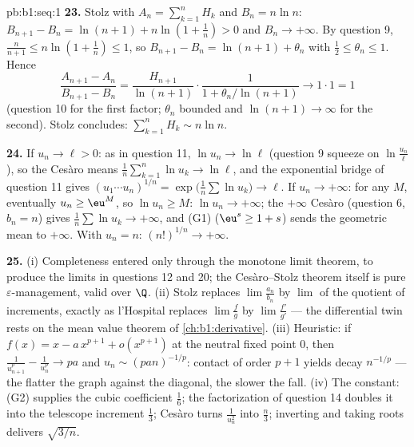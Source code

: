 \begin{solution}{pb:b1:seq:1}
\textbf{23.} Stolz with $A_n = \sum_{k=1}^n H_k$ and $B_n = n\ln
n$: $B_{n+1} - B_n = \ln(n+1) + n\ln(1 + \frac1n) > 0$ and $B_n
\to +\infty$. By question 9, $\frac{n}{n+1} \leq n\ln(1 +
\frac1n) \leq 1$, so $B_{n+1} - B_n = \ln(n+1) + \theta_n$ with
$\frac12 \leq \theta_n \leq 1$. Hence
\[
\frac{A_{n+1} - A_n}{B_{n+1} - B_n}
= \frac{H_{n+1}}{\ln(n+1)}\cdot
\frac{1}{1 + \theta_n/\ln(n+1)} \longrightarrow 1 \cdot 1 = 1
\]
(question 10 for the first factor; $\theta_n$ bounded and
$\ln(n+1) \to \infty$ for the second). Stolz concludes:
$\sum_{k=1}^n H_k \sim n\ln n$.

\textbf{24.} If $u_n \to \ell > 0$: as in question 11, $\ln u_n
\to \ln\ell$ (question 9 squeeze on $\ln\frac{u_n}{\ell}$), so
the Ces\`aro means $\frac1n\sum_{k=1}^n \ln u_k \to \ln\ell$,
and the exponential bridge of question 11 gives $(u_1\cdots
u_n)^{1/n} = \exp\bigl(\frac1n\sum\ln u_k\bigr) \to \ell$. If
$u_n \to +\infty$: for any $M$, eventually $u_n \geq \eu^M$, so
$\ln u_n \geq M$: $\ln u_n \to +\infty$; the $+\infty$ Ces\`aro
(question 6, $b_n = n$) gives $\frac1n\sum \ln u_k \to
+\infty$, and (G1) ($\eu^s \geq 1 + s$) sends the geometric mean
to $+\infty$. With $u_n = n$: $(n!)^{1/n} \to +\infty$.

\textbf{25.} (i) Completeness entered only through the monotone
limit theorem, to produce the limits in questions 12 and 20;
the Ces\`aro--Stolz theorem itself is pure
$\varepsilon$-management, valid over $\Q$. (ii) Stolz replaces
$\lim \frac{a_n}{b_n}$ by $\lim$ of the quotient of increments,
exactly as l'Hospital replaces $\lim\frac fg$ by
$\lim\frac{f'}{g'}$ --- the differential twin rests on the mean
value theorem of \cref{ch:b1:derivative}. (iii) Heuristic: if
$f(x) = x - a\,x^{p+1} + o(x^{p+1})$ at the neutral fixed point
$0$, then $\frac{1}{u_{n+1}^p} - \frac{1}{u_n^p} \to pa$ and
$u_n \sim (pan)^{-1/p}$: contact of order $p + 1$ yields decay
$n^{-1/p}$ --- the flatter the graph against the diagonal, the
slower the fall. (iv) The constant: (G2) supplies the cubic
coefficient $\frac16$; the factorization of question 14 doubles
it into the telescope increment $\frac13$; Ces\`aro turns
$\frac{1}{u_n^2}$ into $\frac n3$; inverting and taking roots
delivers $\sqrt{3/n}$.
\end{solution}
